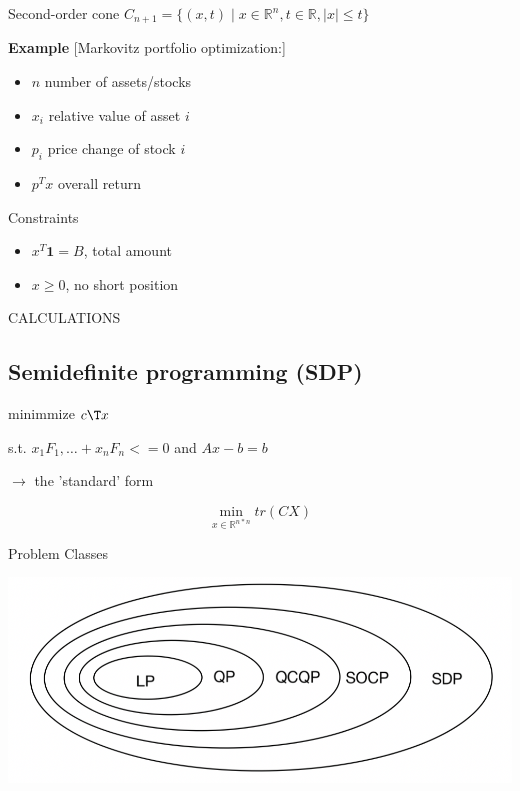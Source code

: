 Second-order cone
$C_{n+1}=\{ (x,t)\mid
	x\in\mathbb{R}^{n}, t\in \mathbb{R}, |x|\le t \}$

\textbf{Example} [Markovitz portfolio optimization:]

\begin{itemize}
	\item $n$ number of assets/stocks
	\item $x_i$ relative value of asset $i$
	\item $p_i$ price change of stock $i$
	\item $p^Tx$ overall return
\end{itemize}

Constraints

\begin{itemize}
	\item $x^T\textbf{1} = B$, total amount
	\item $x\ge0$, no short position
\end{itemize}

CALCULATIONS

\subsection{Semidefinite programming (SDP)}

minimmize $c\T x$

s.t. $x_1F_1,\dots+x_nF_n <= 0$ and $Ax-b=b$

$\rightarrow$ the 'standard' form

$$\min _{x \in \mathbb{R}^{n*n}} tr(CX)$$

Problem Classes

\includegraphics[width=\columnwidth]{images/problem_class.png}
